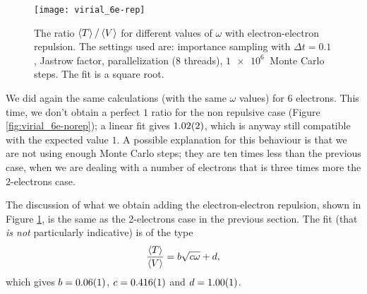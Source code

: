\begin{figure}[h]%
	\centering
	\texttt{[image: virial\_6e-rep]}
	\caption{The ratio $\Braket{T} / \Braket{V}$ for different values of $\omega$ with electron-electron repulsion. The settings used are: importance sampling with $\Delta t = 0.1$, Jastrow factor, parallelization (8 threads), $\SI{1e6}{}$ Monte Carlo steps. The fit is a square root.}
	\label{fig:virial_6e-rep}
\end{figure}

We did again the same calculations (with the same $\omega$ values) for $6$ electrons. This time, we don't obtain a perfect $1$ ratio for the non repulsive case (Figure \ref{fig:virial_6e-norep}); a linear fit gives $\SI{1.02 \pm 0.02}{}$, which is anyway still compatible with the expected value $1$. A possible explanation for this behaviour is that we are not using enough Monte Carlo steps; they are ten times less than the previous case, when we are dealing with a number of electrons that is three times more the 2-electrons case.

The discussion of what we obtain adding the electron-electron repulsion, shown in Figure \ref{fig:virial_6e-rep}, is the same as the 2-electrons case in the previous section. The fit (that \emph{is not} particularly indicative) is of the type
\begin{equation}
	\frac{\Braket{T}}{\Braket{V}} = b\sqrt{c\omega}+d,
\end{equation}
which gives $b = \SI{0.06 \pm 0.01}{}$, $c = \SI{0.416 \pm 0.001}{}$ and $d = \SI{1.00 \pm 0.01}{}$.